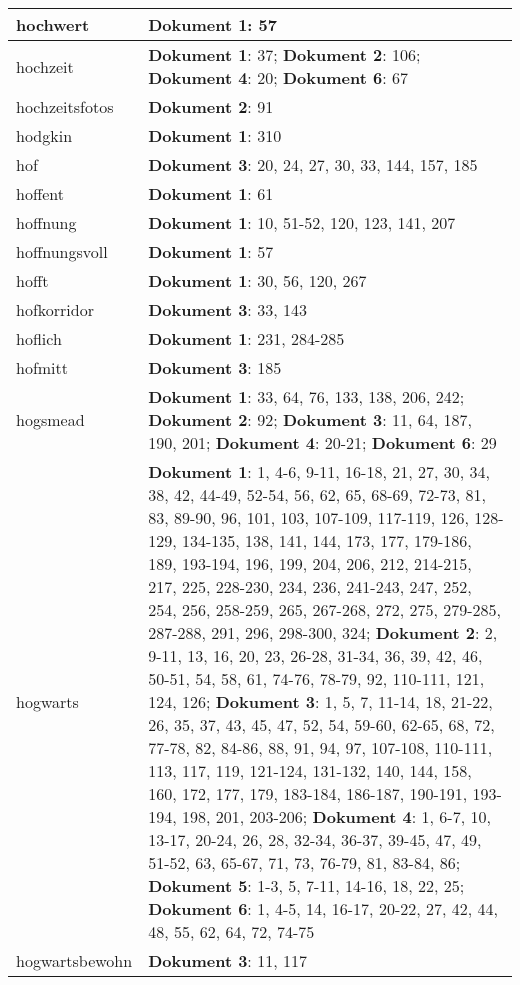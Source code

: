 \documentclass[a5paper]{article}
\begin{document}
\begin{longtable}[l]{|l|p{3in}|}
\hline
hochwert & \textbf{Dokument 1}: 57 \\
\hline
hochzeit & \textbf{Dokument 1}: 37; \textbf{Dokument 2}: 106; \textbf{Dokument 4}: 20; \textbf{Dokument 6}: 67 \\
\hline
hochzeitsfotos & \textbf{Dokument 2}: 91 \\
\hline
hodgkin & \textbf{Dokument 1}: 310 \\
\hline
hof & \textbf{Dokument 3}: 20, 24, 27, 30, 33, 144, 157, 185 \\
\hline
hoffent & \textbf{Dokument 1}: 61 \\
\hline
hoffnung & \textbf{Dokument 1}: 10, 51-52, 120, 123, 141, 207 \\
\hline
hoffnungsvoll & \textbf{Dokument 1}: 57 \\
\hline
hofft & \textbf{Dokument 1}: 30, 56, 120, 267 \\
\hline
hofkorridor & \textbf{Dokument 3}: 33, 143 \\
\hline
hoflich & \textbf{Dokument 1}: 231, 284-285 \\
\hline
hofmitt & \textbf{Dokument 3}: 185 \\
\hline
hogsmead & \textbf{Dokument 1}: 33, 64, 76, 133, 138, 206, 242; \textbf{Dokument 2}: 92; \textbf{Dokument 3}: 11, 64, 187, 190, 201; \textbf{Dokument 4}: 20-21; \textbf{Dokument 6}: 29 \\
\hline
hogwarts & \textbf{Dokument 1}: 1, 4-6, 9-11, 16-18, 21, 27, 30, 34, 38, 42, 44-49, 52-54, 56, 62, 65, 68-69, 72-73, 81, 83, 89-90, 96, 101, 103, 107-109, 117-119, 126, 128-129, 134-135, 138, 141, 144, 173, 177, 179-186, 189, 193-194, 196, 199, 204, 206, 212, 214-215, 217, 225, 228-230, 234, 236, 241-243, 247, 252, 254, 256, 258-259, 265, 267-268, 272, 275, 279-285, 287-288, 291, 296, 298-300, 324; \textbf{Dokument 2}: 2, 9-11, 13, 16, 20, 23, 26-28, 31-34, 36, 39, 42, 46, 50-51, 54, 58, 61, 74-76, 78-79, 92, 110-111, 121, 124, 126; \textbf{Dokument 3}: 1, 5, 7, 11-14, 18, 21-22, 26, 35, 37, 43, 45, 47, 52, 54, 59-60, 62-65, 68, 72, 77-78, 82, 84-86, 88, 91, 94, 97, 107-108, 110-111, 113, 117, 119, 121-124, 131-132, 140, 144, 158, 160, 172, 177, 179, 183-184, 186-187, 190-191, 193-194, 198, 201, 203-206; \textbf{Dokument 4}: 1, 6-7, 10, 13-17, 20-24, 26, 28, 32-34, 36-37, 39-45, 47, 49, 51-52, 63, 65-67, 71, 73, 76-79, 81, 83-84, 86; \textbf{Dokument 5}: 1-3, 5, 7-11, 14-16, 18, 22, 25; \textbf{Dokument 6}: 1, 4-5, 14, 16-17, 20-22, 27, 42, 44, 48, 55, 62, 64, 72, 74-75 \\
\hline
hogwartsbewohn & \textbf{Dokument 3}: 11, 117 \\

\end{longtable}
\end{document}
